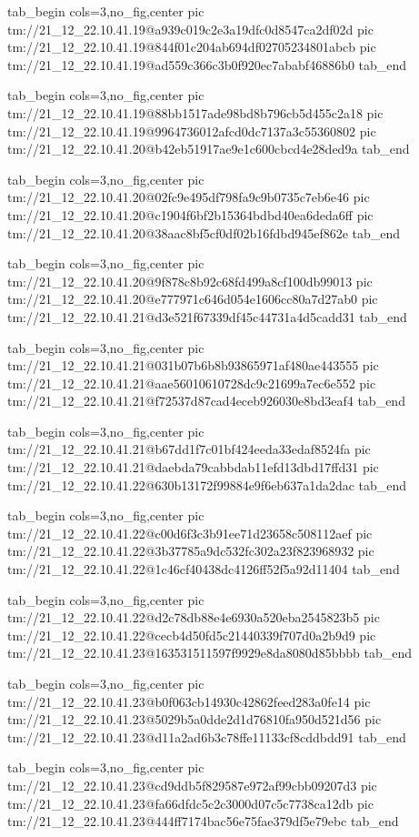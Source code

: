 \ifcmt
  tab_begin cols=3,no_fig,center
    pic tm://21_12_22.10.41.19@a939c019c2e3a19dfc0d8547ca2df02d
    pic tm://21_12_22.10.41.19@844f01c204ab694df02705234801abcb
    pic tm://21_12_22.10.41.19@ad559c366c3b0f920ec7ababf46886b0
  tab_end
\fi


\ifcmt
  tab_begin cols=3,no_fig,center
    pic tm://21_12_22.10.41.19@88bb1517ade98bd8b796cb5d455c2a18
    pic tm://21_12_22.10.41.19@9964736012afcd0dc7137a3c55360802
    pic tm://21_12_22.10.41.20@b42eb51917ae9e1c600cbcd4e28ded9a
  tab_end
\fi


\ifcmt
  tab_begin cols=3,no_fig,center
    pic tm://21_12_22.10.41.20@02fc9e495df798fa9c9b0735c7eb6e46
    pic tm://21_12_22.10.41.20@c1904f6bf2b15364bdbd40ea6deda6ff
    pic tm://21_12_22.10.41.20@38aac8bf5cf0df02b16fdbd945ef862e
  tab_end
\fi


\ifcmt
  tab_begin cols=3,no_fig,center
    pic tm://21_12_22.10.41.20@9f878c8b92c68fd499a8cf100db99013
    pic tm://21_12_22.10.41.20@e777971c646d054e1606cc80a7d27ab0
    pic tm://21_12_22.10.41.21@d3e521f67339df45c44731a4d5cadd31
  tab_end
\fi


\ifcmt
  tab_begin cols=3,no_fig,center
    pic tm://21_12_22.10.41.21@031b07b6b8b93865971af480ae443555
    pic tm://21_12_22.10.41.21@aae56010610728dc9c21699a7ec6e552
    pic tm://21_12_22.10.41.21@f72537d87cad4eceb926030e8bd3eaf4
  tab_end
\fi


\ifcmt
  tab_begin cols=3,no_fig,center
    pic tm://21_12_22.10.41.21@b67dd1f7c01bf424eeda33edaf8524fa
    pic tm://21_12_22.10.41.21@daebda79cabbdab11efd13dbd17ffd31
    pic tm://21_12_22.10.41.22@630b13172f99884e9f6eb637a1da2dac
  tab_end
\fi


\ifcmt
  tab_begin cols=3,no_fig,center
    pic tm://21_12_22.10.41.22@c00d6f3c3b91ee71d23658c508112aef
    pic tm://21_12_22.10.41.22@3b37785a9dc532fc302a23f823968932
    pic tm://21_12_22.10.41.22@1c46cf40438dc4126ff52f5a92d11404
  tab_end
\fi


\ifcmt
  tab_begin cols=3,no_fig,center
    pic tm://21_12_22.10.41.22@d2c78db88e4e6930a520eba2545823b5
    pic tm://21_12_22.10.41.22@cecb4d50fd5c21440339f707d0a2b9d9
    pic tm://21_12_22.10.41.23@163531511597f9929e8da8080d85bbbb
  tab_end
\fi


\ifcmt
  tab_begin cols=3,no_fig,center
    pic tm://21_12_22.10.41.23@b0f063cb14930c42862feed283a0fe14
    pic tm://21_12_22.10.41.23@5029b5a0dde2d1d76810fa950d521d56
    pic tm://21_12_22.10.41.23@d11a2ad6b3c78ffe11133cf8cddbdd91
  tab_end
\fi


\ifcmt
  tab_begin cols=3,no_fig,center
    pic tm://21_12_22.10.41.23@cd9ddb5f829587e972af99cbb09207d3
    pic tm://21_12_22.10.41.23@fa66dfdc5c2c3000d07c5c7738ca12db
    pic tm://21_12_22.10.41.23@444ff7174bac56e75fae379df5e79ebc
  tab_end
\fi


